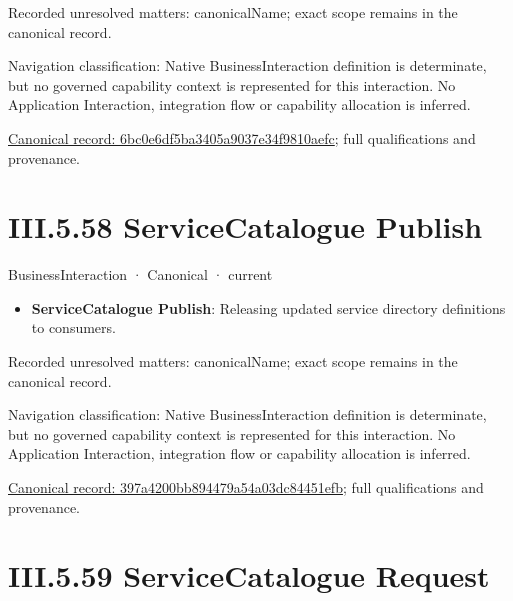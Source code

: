 {\small Recorded unresolved matters: canonicalName; exact scope remains in the canonical record.}\par
{\small Navigation classification: Native BusinessInteraction definition is determinate, but no governed capability context is represented for this interaction. No Application Interaction, integration flow or capability allocation is inferred.}\par
{\footnotesize \href{../../../../../../../continuum/business/business-interaction/6bc0e6df5ba3405a9037e34f9810aefc.md}{Canonical record: 6bc0e6df5ba3405a9037e34f9810aefc}; full qualifications and provenance.}\par
\section*{III.5.58 ServiceCatalogue Publish}
\label{navigation:III.5.58}

\label{element:397a4200bb894479a54a03dc84451efb}
{\small BusinessInteraction · Canonical · current}\par

\begin{itemize}


\item \textbf{ServiceCatalogue Publish}: Releasing updated service directory definitions to consumers.

\end{itemize}

{\small Recorded unresolved matters: canonicalName; exact scope remains in the canonical record.}\par
{\small Navigation classification: Native BusinessInteraction definition is determinate, but no governed capability context is represented for this interaction. No Application Interaction, integration flow or capability allocation is inferred.}\par
{\footnotesize \href{../../../../../../../continuum/business/business-interaction/397a4200bb894479a54a03dc84451efb.md}{Canonical record: 397a4200bb894479a54a03dc84451efb}; full qualifications and provenance.}\par
\section*{III.5.59 ServiceCatalogue Request}
\label{navigation:III.5.59}

